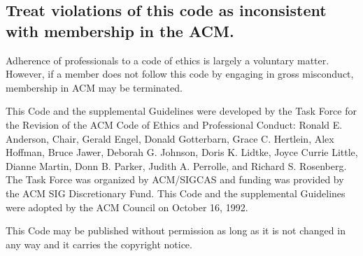 \documentclass{article}
\begin{document}
\subsection{Treat violations of this code as inconsistent with membership in
the ACM.}

Adherence of professionals to a code of ethics is largely a voluntary matter.
However, if a member does not follow this code by engaging in gross misconduct,
membership in ACM may be terminated.

\vfill

This Code and the supplemental Guidelines were developed by the Task Force for
the Revision of the ACM Code of Ethics and Professional Conduct: Ronald E.
Anderson, Chair, Gerald Engel, Donald Gotterbarn, Grace C. Hertlein, Alex
Hoffman, Bruce Jawer, Deborah G. Johnson, Doris K. Lidtke, Joyce Currie Little,
Dianne Martin, Donn B. Parker, Judith A. Perrolle, and Richard S. Rosenberg.
The Task Force was organized by ACM/SIGCAS and funding was provided by the ACM
SIG Discretionary Fund. This Code and the supplemental Guidelines were adopted
by the ACM Council on October 16, 1992.

This Code may be published without permission as long as it is not changed in
any way and it carries the copyright notice.
\end{document}
